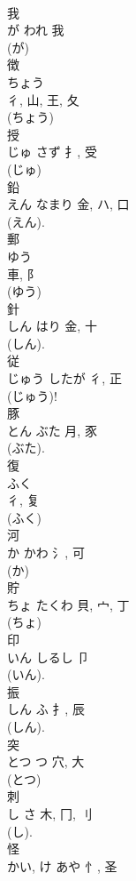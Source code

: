 \documentclass[8pt]{extreport}
\begin{document}
\begin{CJK}{UTF8}{min}
\\	我	
\\	が	われ	我	
\\	(が) 
\\	徴	
\\	ちょう	
\\	彳, 山, 王, 夂	
\\	(ちょう) 
\\	授	
\\	じゅ	さず	扌, 受	
\\	(じゅ) 
\\	鉛	
\\	えん	なまり	金, ハ, 口	
\\	(えん).	
\\	郵	
\\	ゆう	
\\	車, 阝	
\\	(ゆう) 
\\	針	
\\	しん	はり	金, 十	
\\	(しん). 
\\	従	
\\	じゅう	したが	彳, 正		
\\	(じゅう)!	
\\	豚	
\\	とん	ぶた	月, 豕	
\\	(ぶた). 
\\	復	
\\	ふく	
\\	彳, 复	
\\	(ふく) 
\\	河	
\\	か	かわ	氵, 可	
\\	(か) 
\\	貯	
\\	ちょ	たくわ	貝, 宀, 丁	
\\	(ちょ) 
\\	印	
\\	いん	しるし	卩		
\\	(いん). 
\\	振	
\\	しん	ふ	扌, 辰	
\\	(しん). 
\\	突	
\\	とつ	つ	穴, 大	
\\	(とつ) 
\\	刺	
\\	し	さ	木, 冂, 刂	
\\	(し). 
\\	怪	
\\	かい, け	あや	忄, 圣	

\end{CJK}
\end{document}
